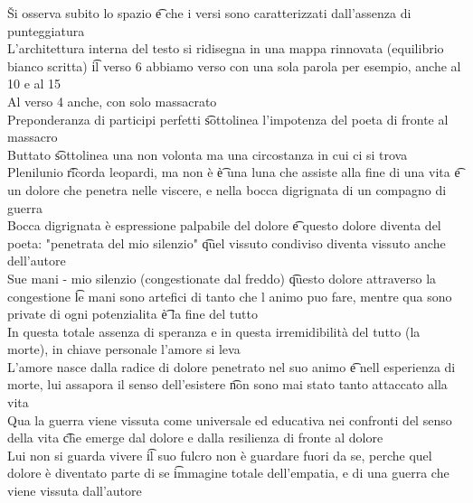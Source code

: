 \documentclass[12pt]{article}
\begin{document}
\v

Si osserva subito lo spazio \t e che i versi sono caratterizzati dall'assenza di punteggiatura \\
L'architettura interna del testo si ridisegna in una mappa rinnovata (equilibrio bianco scritta) \t il verso 6 abbiamo verso con una sola parola per esempio, anche al 10 e al 15 \\
Al verso 4 anche, con solo massacrato \\
Preponderanza di participi perfetti \t sottolinea l'impotenza del poeta di fronte al massacro \\
Buttato \t sottolinea una non volonta ma una circostanza in cui ci si trova \\
Plenilunio \t ricorda leopardi, ma non è \t è una luna che assiste alla fine di una vita \t e un dolore che penetra nelle viscere, e nella bocca digrignata di un compagno di guerra \\
Bocca digrignata è espressione palpabile del dolore \t e questo dolore diventa del poeta: "penetrata del mio silenzio" \t quel vissuto condiviso diventa vissuto anche dell'autore \\
Sue mani - mio silenzio (congestionate dal freddo) \t questo dolore attraverso la congestione \t le mani sono artefici di tanto che l animo puo fare, mentre qua sono private di ogni potenzialita \t è la fine del tutto \\
In questa totale assenza di speranza e in questa irremidibilità del tutto (la morte), in chiave personale l'amore si leva \\
L'amore nasce dalla radice di dolore penetrato nel suo animo \t e nell esperienza di morte, lui assapora il senso dell'esistere \t non sono mai stato tanto attaccato alla vita  \\
Qua la guerra viene vissuta come universale ed educativa nei confronti del senso della vita \t che emerge dal dolore e dalla resilienza di fronte al dolore \\
Lui non si guarda vivere \t il suo fulcro non è guardare fuori da se, perche quel dolore è diventato parte di se \t immagine totale dell'empatia, e di una guerra che viene vissuta dall'autore 
\end{document}
